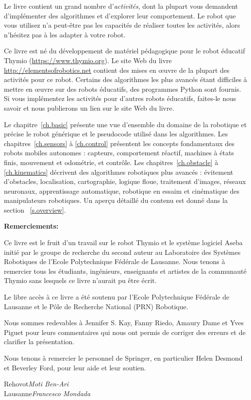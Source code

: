Le livre contient un grand nombre d'\emph{activités}, dont la plupart vous demandent d'implémenter des algorithmes et d'explorer leur comportement. Le robot que vous utilisez n'a peut-être pas les capacités de réaliser toutes les activités, alors n'hésitez pas à les adapter à votre robot.

Ce livre est né du développement de matériel pédagogique pour le robot éducatif Thymio (\url{https://www.thymio.org}). Le site Web du livre \url{http://elementsofrobotics.net} contient des mises en œuvre de la plupart des activités pour ce robot. Certains des algorithmes les plus avancés étant difficiles à mettre en œuvre sur des robots éducatifs, des programmes Python sont fournis. Si vous implémentez les activités pour d'autres robots éducatifs, faites-le nous savoir et nous publierons un lien sur le site Web du livre.

Le chapitre~\ref{ch.basic} présente une vue d'ensemble du domaine de la robotique et précise le robot générique et le pseudocode utilisé dans les algorithmes. Les chapitres~\ref{ch.sensors} à \ref{ch.control} présentent les concepts fondamentaux des robots mobiles autonomes : capteurs, comportement réactif, machines à états finis, mouvement et odométrie, et contrôle. Les chapitres~\ref{ch.obstacle} à \ref{ch.kinematics} décrivent des algorithmes robotiques plus avancés : évitement d'obstacles, localisation, cartographie, logique floue, traitement d'images, réseaux neuronaux, apprentissage automatique, robotique en essaim et cinématique des manipulateurs robotiques. Un aperçu détaillé du contenu est donné dans la section ~\ref{s.overview}.

\bigskip

\noindent\textbf{Remerciements:}

Ce livre est le fruit d'un travail sur le robot Thymio et le système logiciel Aseba initié par le groupe de recherche du second auteur au Laboratoire des Systèmes Robotiques de l'Ecole Polytechnique Fédérale de Lausanne. Nous tenons à remercier tous les étudiants, ingénieurs, enseignants et artistes de la communauté Thymio sans lesquels ce livre n'aurait pu être écrit.

Le libre accès à ce livre a été soutenu par l'Ecole Polytechnique Fédérale de Lausanne et le Pôle de Recherche National (PRN) Robotique.

Nous sommes redevables à Jennifer S. Kay, Fanny Riedo, Amaury Dame et Yves Piguet pour leurs commentaires qui nous ont permis de corriger des erreurs et de clarifier la présentation.

Nous tenons à remercier le personnel de Springer, en particulier Helen Desmond et Beverley Ford, pour leur aide et leur soutien.

\bigskip

\begin{flushright}\noindent
Rehovot\hfill {\it Moti Ben-Ari}\\
Lausanne\hfill {\it Francesco Mondada}\\
\end{flushright}
 
\tableofcontents
